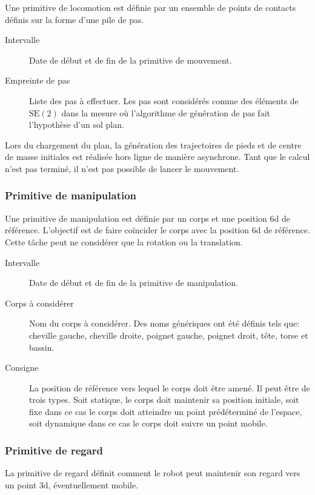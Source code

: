 Une primitive de locomotion est définie par un ensemble de points de
contacts définis sur la forme d'une pile de pas.

\begin{description}
\item[Intervalle] Date de début et de fin de la primitive de mouvement.
\item[Empreinte de pas] Liste des pas à effectuer. Les pas sont
  considérés comme des éléments de $\text{SE}(2)$ dans la mesure où
  l'algorithme de génération de pas fait l'hypothèse d'un sol plan.
\end{description}

Lors du chargement du plan, la génération des trajectoires de pieds et
de centre de masse initiales est réalisée hors ligne de manière
asynchrone. Tant que le calcul n'est pas terminé, il n'est pas
possible de lancer le mouvement.


\subsubsection{Primitive de manipulation}

Une primitive de manipulation est définie par un corps et une position
6d de référence. L'objectif est de faire coïncider le corps avec la
position 6d de référence. Cette tâche peut ne considérer que la
rotation ou la translation.

\begin{description}
\item[Intervalle] Date de début et de fin de la primitive de manipulation.
\item[Corps à considérer] Nom du corps à considérer. Des noms
  génériques ont été définis tels que: cheville gauche, cheville
  droite, poignet gauche, poignet droit, tête, torse et bassin.
\item[Consigne] La position de référence vers lequel le corps doit
  être amené. Il peut être de trois types. Soit statique, le corps
  doit maintenir sa position initiale, soit fixe dans ce cas le corps
  doit atteindre un point prédéterminé de l'espace, soit dynamique
  dans ce cas le corps doit suivre un point mobile.
\end{description}


\subsubsection{Primitive de regard}

La primitive de regard définit comment le robot peut maintenir son
regard vers un point 3d, éventuellement mobile.

